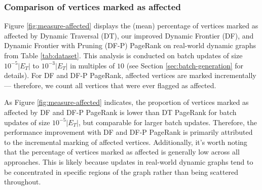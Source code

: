 


\subsubsection{Comparison of vertices marked as affected}

Figure \ref{fig:measure-affected} displays the (mean) percentage of vertices marked as affected by Dynamic Traversal (DT), our improved Dynamic Frontier (DF), and Dynamic Frontier with Pruning (DF-P) PageRank on real-world dynamic graphs from Table \ref{tab:dataset}. This analysis is conducted on batch updates of size $10^{-5}|E_T|$ to $10^{-3}|E_T|$ in multiples of $10$ (see Section \ref{sec:batch-generation} for details). For DF and DF-P PageRank, affected vertices are marked incrementally --- therefore, we count all vertices that were ever flagged as affected.

As Figure \ref{fig:measure-affected} indicates, the proportion of vertices marked as affected by DF and DF-P PageRank is lower than DT PageRank for batch updates of size $10^{-5}|E_T|$, but comparable for larger batch updates. Therefore, the performance improvement with DF and DF-P PageRank is primarily attributed to the incremental marking of affected vertices. Additionally, it's worth noting that the percentage of vertices marked as affected is generally low across all approaches. This is likely because updates in real-world dynamic graphs tend to be concentrated in specific regions of the graph rather than being scattered throughout.


